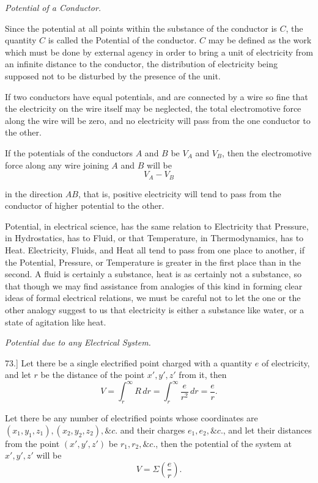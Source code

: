 \documentclass[11pt,a4paper]{article}
\begin{document}
\begin{center}
\textit{Potential of a Conductor.}
\end{center}

Since the potential at all points within the substance of the conductor
is \(C\), the quantity \(C\) is called the Potential of the conductor.
\(C\) may be defined as the work which must be done by external agency
in order to bring a unit of electricity from an infinite distance to
the conductor, the distribution of electricity being supposed not to be
disturbed by the presence of the unit.

If two conductors have equal potentials, and are connected by a wire
so fine that the electricity on the wire itself may be neglected, the
total electromotive force along the wire will be zero, and no electricity
will pass from the one conductor to the other.

If the potentials of the conductors \(A\) and \(B\) be \(V_A\) and
\(V_B\), then the electromotive force along any wire joining \(A\) and
\(B\) will be
\[
V_A-V_B
\]

\clearpage
\setcounter{footnote}{0}

in the direction \(AB\), that is, positive electricity will tend to pass
from the conductor of higher potential to the other.

Potential, in electrical science, has the same relation to Electricity
that Pressure, in Hydrostatics, has to Fluid, or that Temperature, in
Thermodynamics, has to Heat. Electricity, Fluids, and Heat all tend to
pass from one place to another, if the Potential, Pressure, or Temperature
is greater in the first place than in the second. A fluid is certainly
a substance, heat is as certainly not a substance, so that though we may
find assistance from analogies of this kind in forming clear ideas of
formal electrical relations, we must be careful not to let the one or
the other analogy suggest to us that electricity is either a substance
like water, or a state of agitation like heat.

\begin{center}
\textit{Potential due to any Electrical System.}
\end{center}

73.] Let there be a single electrified point charged with a quantity
\(e\) of electricity, and let \(r\) be the distance of the point
\(x',y',z'\) from it, then
\[
V=\int_r^\infty R\,dr=\int_r^\infty \frac{e}{r^2}\,dr=\frac{e}{r}.
\]

Let there be any number of electrified points whose coordinates are
\((x_1,y_1,z_1), (x_2,y_2,z_2), \&c.\) and their charges \(e_1,e_2,\&c.\),
and let their distances from the point \((x',y',z')\) be
\(r_1,r_2,\&c.\), then the potential of the system at \(x',y',z'\) will be
\[
V=\Sigma\left(\frac{e}{r}\right).
\]
\end{document}
